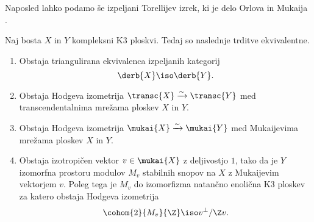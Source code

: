 Naposled lahko podamo še izpeljani Torellijev izrek, ki je delo Orlova \cite{Orlov2003} in Mukaija \cite{Mukai1987}.

\begin{izrek}
    \emph{\cite{Orlov2003,Mukai1987}}
    Naj bosta $X$ in $Y$ kompleksni K3 ploskvi. Tedaj so naslednje trditve ekvivalentne. 
    \begin{enumerate}[label = (\roman*)]
        \item Obstaja triangulirana ekvivalenca izpeljanih kategorij 
        \[
            \derb{X} \iso \derb{Y}.
        \]
        \item Obstaja Hodgeva izometrija $\transc{X} \xrightarrow{\sim} \transc{Y}$ med transcendentalnima mrežama ploskev $X$ in $Y$.
        \item Obstaja Hodgeva izometrija $\mukai{X} \xrightarrow{\sim} \mukai{Y}$ med Mukaijevima mrežama ploskev $X$ in $Y$. 
        \item Obstaja izotropičen vektor $v \in \mukai{X}$ z deljivostjo $1$, tako da je $Y$ izomorfna prostoru modulov $M_v$ stabilnih snopov na $X$ z Mukaijevim vektorjem $v$. Poleg tega je $M_v$ do izomorfizma natančno enolična K3 ploskev za katero obstaja Hodgeva izometrija 
        \[
            \cohom{2}{M_v}{\Z} \iso v^\perp / \Z v.  
        \]
    \end{enumerate}
\end{izrek}